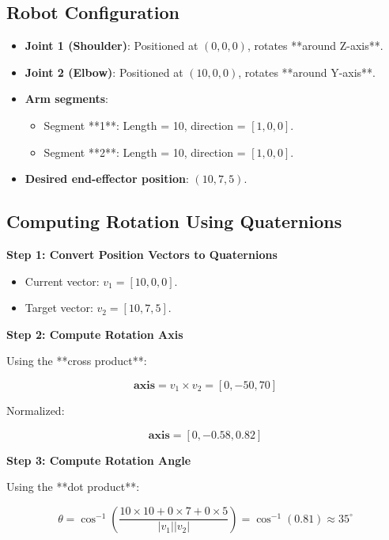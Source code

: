 \documentclass{article}
\begin{document}
\subsection{Robot Configuration}
\begin{itemize}
    \item \textbf{Joint 1 (Shoulder)}: Positioned at \( (0, 0, 0) \), rotates **around Z-axis**.
    \item \textbf{Joint 2 (Elbow)}: Positioned at \( (10, 0, 0) \), rotates **around Y-axis**.
    \item \textbf{Arm segments}:
        \begin{itemize}
            \item Segment **1**: Length = 10, direction = \([1, 0, 0]\).
            \item Segment **2**: Length = 10, direction = \([1, 0, 0]\).
        \end{itemize}
    \item \textbf{Desired end-effector position}: \( (10, 7, 5) \).
\end{itemize}

\subsection{Computing Rotation Using Quaternions}
\textbf{Step 1: Convert Position Vectors to Quaternions}

\begin{itemize}
    \item Current vector: \( v_1 = [10, 0, 0] \).
    \item Target vector: \( v_2 = [10, 7, 5] \).
\end{itemize}

\textbf{Step 2: Compute Rotation Axis}

Using the **cross product**:



\[
\mathbf{axis} = v_1 \times v_2 = [0, -50, 70]
\]



Normalized:



\[
\mathbf{axis} = [0, -0.58, 0.82]
\]



\textbf{Step 3: Compute Rotation Angle}

Using the **dot product**:



\[
\theta = \cos^{-1} \left( \frac{10 \times 10 + 0 \times 7 + 0 \times 5}{|v_1| |v_2|} \right) = \cos^{-1} (0.81) \approx 35^\circ
\]
\end{document}
